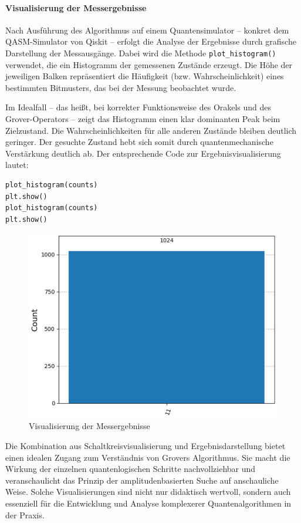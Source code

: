 \paragraph*{Visualisierung der Messergebnisse}
\mbox{}

Nach Ausführung des Algorithmus auf einem Quantensimulator – konkret dem QASM-Simulator von Qiskit – erfolgt die Analyse der Ergebnisse durch grafische Darstellung der Messausgänge.  Dabei wird die Methode \texttt{plot\_histogram()} verwendet, die ein Histogramm der gemessenen Zustände erzeugt.  Die Höhe der jeweiligen Balken repräsentiert die Häufigkeit (bzw. Wahrscheinlichkeit) eines bestimmten Bitmusters, das bei der Messung beobachtet wurde. 

Im Idealfall – das heißt, bei korrekter Funktionsweise des Orakels und des Grover-Operators – zeigt das Histogramm einen klar dominanten Peak beim Zielzustand.  Die Wahrscheinlichkeiten für alle anderen Zustände bleiben deutlich geringer.  Der gesuchte Zustand hebt sich somit durch quantenmechanische Verstärkung deutlich ab.  Der entsprechende Code zur Ergebnisvisualisierung lautet: 
\begin{verbatim}
plot_histogram(counts)
plt.show()
plot_histogram(counts)
plt.show()
\end{verbatim}

\begin{figure}
    \centering
    \includegraphics[width=0.75\linewidth]{Visualisierung der Messergebnisse.png}
    \caption{Visualisierung der Messergebnisse}
    \label{fig:enter-label}
\end{figure}

Die Kombination aus Schaltkreisvisualisierung und Ergebnisdarstellung bietet einen idealen Zugang zum Verständnis von Grovers Algorithmus.  Sie macht die Wirkung der einzelnen quantenlogischen Schritte nachvollziehbar und veranschaulicht das Prinzip der amplitudenbasierten Suche auf anschauliche Weise.  Solche Visualisierungen sind nicht nur didaktisch wertvoll, sondern auch essenziell für die Entwicklung und Analyse komplexerer Quantenalgorithmen in der Praxis. 

